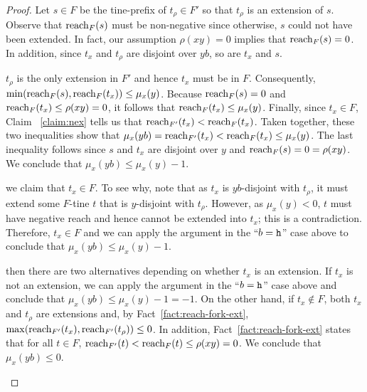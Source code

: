 \begin{proof}
    Let $s \in F$ be the tine-prefix of $t_\rho \in F'$ so that 
    $t_\rho$ is an extension of $s$. 
    Observe that $\operatorname{reach}_F(s)$ must be non-negative since 
    otherwise, $s$ could not have been extended. 
    In fact, our assumption $\rho(xy)=0$ implies that 
    $\operatorname{reach}_F(s) = 0$. 
    In addition, since $t_x$ and $t_\rho$ are disjoint over $yb$, 
    so are $t_x$ and $s$. 
    \begin{description}[font=\normalfont\itshape\space]
      \item[If $b = \h$,] 
      $t_\rho$ is the only extension in $F'$ and hence 
      $t_x$ must be in $F$. 
      Consequently, 
      $\min( \operatorname{reach}_F(s),\operatorname{reach}_F(t_x) ) \leq \mu_x(y)$. 
      Because $\operatorname{reach}_F(s)=0$ and $\operatorname{reach}_F(t_x) \leq \rho(xy)=0$, it follows that $\operatorname{reach}_F(t_x) \leq \mu_x(y)$. 
      Finally, since $t_x \in F$, 
      Claim ~\ref{claim:nex} tells us that 
      $\operatorname{reach}_{F'}(t_x) < \operatorname{reach}_F(t_x)$. 
      Taken together, these two inequalities show that 
      $\mu_x(yb) = \operatorname{reach}_{F'}(t_x) < \operatorname{reach}_F(t_x) \leq \mu_x(y)$. 
      The last inequality follows since $s$ and $t_x$ are disjoint over $y$ and $\operatorname{reach}_F(s) = 0 = \rho(xy)$. 
      We conclude that $\mu_x(yb) \leq \mu_x(y) - 1$.

      \item[If $b = \H$ and $\mu_x(y) < 0$,] 
      we claim that $t_x \in F$. 
      To see why, note that as $t_x$ is $yb$-disjoint with $t_\rho$, 
      it must extend some $F$-tine $t$ that is $y$-disjoint with $t_\rho$. 
      However, as $\mu_x(y) < 0$, $t$ must have negative reach and hence cannot be extended into $t_x$; this is a contradiction. 
      Therefore, $t_x \in F$ and we can apply the argument in the ``$b = \h$'' case above 
      to conclude that $\mu_x(yb) \leq \mu_x(y) - 1$.

      \item[If $b = \H$ and $\mu_x(y) = 0$,] 
      then there are two alternatives depending on 
      whether $t_x$ is an extension. 
      If $t_x$ is not an extension, we can apply the argument in the ``$b = \h$'' case above and conclude that 
      $\mu_x(yb) \leq \mu_x(y) - 1 = -1$.
      On the other hand, if $t_x \not\in F$, 
      both $t_x$ and $t_\rho$ are extensions and, 
      by Fact~\ref{fact:reach-fork-ext}, 
      $\max(\operatorname{reach}_{F'}(t_x), \operatorname{reach}_{F'}(t_\rho) ) \leq 0$. 
      In addition, Fact~\ref{fact:reach-fork-ext} states that for all $t \in F$, 
      $\operatorname{reach}_{F'}(t) < \operatorname{reach}_{F}(t) \leq \rho(xy) = 0$. 
      We conclude that $\mu_x(yb) \leq 0$.


\end{description}
\end{proof}
